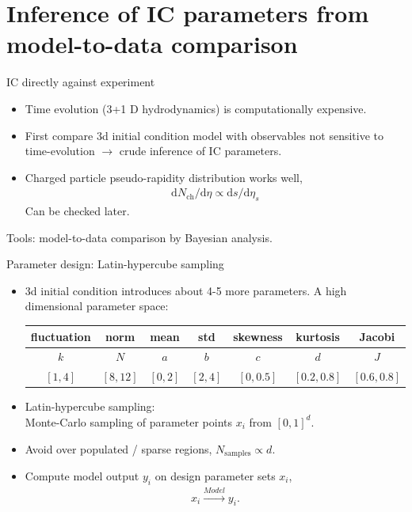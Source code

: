 \documentclass[11pt]{beamer}
\begin{document}

\section{Inference of IC parameters from model-to-data comparison}
\begin{frame}{IC directly against experiment}
\begin{itemize}
\item Time evolution (3+1 D hydrodynamics) is computationally expensive.
\item First compare 3d initial condition model with observables not sensitive to time-evolution $\rightarrow$ crude inference of IC parameters.
\item Charged particle pseudo-rapidity distribution works well,
	\begin{eqnarray}
		\mathrm{d}N_{\textrm{ch}}/\mathrm{d}\eta \propto \mathrm{d}s/\mathrm{d}\eta_s
	\end{eqnarray}
	Can be checked later.
\end{itemize}
Tools: model-to-data comparison by Bayesian analysis.
\end{frame}

\begin{frame}{Parameter design: Latin-hypercube sampling}
\begin{itemize}
\item 3d initial condition introduces about 4-5 more parameters. A high dimensional parameter space:
\begin{center}
\begin{tabular}{ccccccc}
\hline
fluctuation & norm  & 	mean	 	&	std   	&	skewness		&	kurtosis	 & Jacobi	\\
\hline
$k$ & $N$ & $a$ & $b$ & $c$ & $d$ & $J$ \\
$[1,4]$ & $[8,12]$ & $[0,2]$ & $[2,4]$ & $[0, 0.5]$ & $[0.2, 0.8]$ & $[0.6, 0.8]$\\
\hline
\end{tabular}
\end{center}
\item Latin-hypercube sampling: \\Monte-Carlo sampling of parameter points $x_i$ from $[0, 1]^d$.
\item Avoid over populated / sparse regions, $N_{\textrm{samples}} \propto d$.
\item Compute model output $y_i$ on design parameter sets $x_i$,
\begin{eqnarray}
	x_i \xrightarrow{Model} y_i.
\end{eqnarray}
\end{itemize}
\end{frame}
\end{document}

